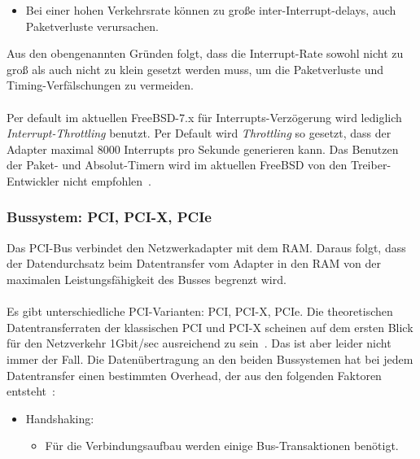 {\begin{itemize}
	\item Bei einer hohen Verkehrsrate können zu große inter-Interrupt-delays,
		auch Paketverluste verursachen.  %
\end{itemize}
Aus den obengenannten Gründen folgt, dass die Interrupt-Rate sowohl nicht zu
groß als auch nicht zu klein gesetzt werden muss, um die Paketverluste und
Timing-Verfälschungen zu vermeiden.\\\\
%
Per default im aktuellen FreeBSD-7.x für Interrupts-Verzögerung wird lediglich
\emph{Interrupt-Throttling} benutzt. Per Default wird \emph{Throttling} so
gesetzt, dass der Adapter maximal 8000 Interrupts pro Sekunde generieren kann.
Das Benutzen der Paket- und Absolut-Timern wird im aktuellen FreeBSD von den
Treiber-Entwickler nicht empfohlen~\cite{man_em}. 
%
\subsubsection{Bussystem: PCI, PCI-X, PCIe}\label{sec:grund_bussyst}
Das PCI-Bus verbindet den Netzwerkadapter mit dem RAM. Daraus folgt, dass der
Datendurchsatz beim Datentransfer vom Adapter in den RAM von der maximalen
Leistungsfähigkeit des Busses begrenzt wird.\\\\
%
Es gibt unterschiedliche PCI-Varianten: PCI, PCI-X, PCIe. Die theoretischen
Datentransferraten  der klassischen PCI und PCI-X scheinen auf dem ersten Blick
für den Netzverkehr 1Gbit/sec ausreichend zu sein~\cite{lodb_wiki}.
Das ist aber leider nicht immer der Fall. Die Datenübertragung an den
beiden Bussystemen hat bei jedem Datentransfer einen bestimmten Overhead, der
aus den folgenden Faktoren entsteht~\cite{pchw}: 
\begin{itemize}
	\item Handshaking: 
		\begin{itemize}
			\item Für die Verbindungsaufbau werden einige Bus-Transaktionen
				benötigt.
		\end{itemize}


\end{itemize}}
